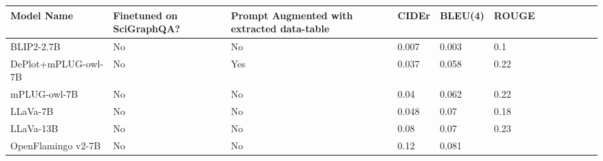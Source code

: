 \documentclass{article}
\begin{document}
\begin{table}[!htbp]\label{mainresultstable}
\renewcommand{\arraystretch}{1.3}
\begin{adjustbox}{max width=\textwidth}
\begin{tabular}{p{4.13cm}p{2.48cm}p{2.48cm}p{2.48cm}p{2.48cm}p{2.48cm}p{4.13cm}p{2.48cm}p{2.48cm}p{2.48cm}p{2.48cm}p{2.48cm}}
\hline
\multicolumn{1}{|p{4.13cm}}{Model Name} & 
\multicolumn{1}{|p{2.48cm}}{Finetuned on SciGraphQA?} & 
\multicolumn{1}{|p{2.48cm}}{Prompt Augmented with extracted data-table} & 
\multicolumn{1}{|p{2.48cm}}{CIDEr} & 
\multicolumn{1}{|p{2.48cm}}{BLEU(4)} & 
\multicolumn{1}{|p{2.48cm}|}{ROUGE} \\ 
\hline
\multicolumn{1}{|p{4.13cm}}{BLIP2-2.7B} & 
\multicolumn{1}{|p{2.48cm}}{No} & 
\multicolumn{1}{|p{2.48cm}}{No} & 
\multicolumn{1}{|p{2.48cm}}{0.007} & 
\multicolumn{1}{|p{2.48cm}}{0.003} & 
\multicolumn{1}{|p{2.48cm}|}{0.1} \\ 
\hline
\multicolumn{1}{|p{4.13cm}}{DePlot+mPLUG-owl-7B} & 
\multicolumn{1}{|p{2.48cm}}{No} & 
\multicolumn{1}{|p{2.48cm}}{Yes} & 
\multicolumn{1}{|p{2.48cm}}{0.037} & 
\multicolumn{1}{|p{2.48cm}}{0.058} & 
\multicolumn{1}{|p{2.48cm}|}{0.22} \\ 
\hline
\multicolumn{1}{|p{4.13cm}}{mPLUG-owl-7B} & 
\multicolumn{1}{|p{2.48cm}}{No} & 
\multicolumn{1}{|p{2.48cm}}{No} & 
\multicolumn{1}{|p{2.48cm}}{0.04} & 
\multicolumn{1}{|p{2.48cm}}{0.062} & 
\multicolumn{1}{|p{2.48cm}|}{0.22} \\ 
\hline
\multicolumn{1}{|p{4.13cm}}{LLaVa-7B} & 
\multicolumn{1}{|p{2.48cm}}{No} & 
\multicolumn{1}{|p{2.48cm}}{No} & 
\multicolumn{1}{|p{2.48cm}}{0.048} & 
\multicolumn{1}{|p{2.48cm}}{0.07} & 
\multicolumn{1}{|p{2.48cm}|}{0.18} \\ 
\hline
\multicolumn{1}{|p{4.13cm}}{LLaVa-13B} & 
\multicolumn{1}{|p{2.48cm}}{No} & 
\multicolumn{1}{|p{2.48cm}}{No} & 
\multicolumn{1}{|p{2.48cm}}{0.08} & 
\multicolumn{1}{|p{2.48cm}}{0.07} & 
\multicolumn{1}{|p{2.48cm}|}{0.23} \\ 
\hline
\multicolumn{1}{|p{4.13cm}}{OpenFlamingo v2-7B} & 
\multicolumn{1}{|p{2.48cm}}{No} & 
\multicolumn{1}{|p{2.48cm}}{No} & 
\multicolumn{1}{|p{2.48cm}}{0.12} & 
\multicolumn{1}{|p{2.48cm}}{0.081} & 

\end{tabular}
\end{adjustbox}
\end{table}
\end{document}
